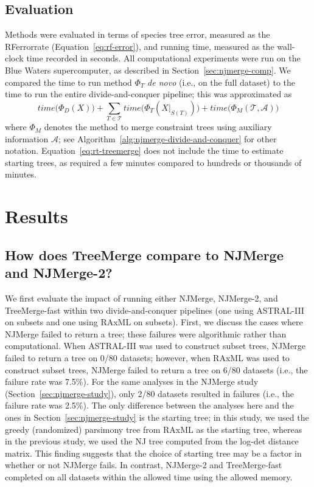 \subsection{Evaluation}
Methods were evaluated in terms of species tree error, measured as the \gls{RFerrorrate} (Equation~\ref{eq:rf-error}), and running time, measured as the wall-clock time recorded in seconds.
All computational experiments were run on the Blue Waters supercomputer, as described in Section~\ref{sec:njmerge-comp}.
We compared the time to run method $\Phi_T$ {\em de novo} (i.e., on the full dataset) to the time to run the entire divide-and-conquer pipeline; this was approximated as
\begin{equation}
	\label{eq:rt-treemerge}
	time\big(\Phi_D(X)\big) +  \sum_{T \in \mathcal{T}} time\big( \Phi_T(X|_{S(T)}) \big) + time\big( \Phi_M(\mathcal{T}, \mathcal{A}) \big)
\end{equation}
where $\Phi_M$ denotes the method to merge constraint trees using auxiliary information $\mathcal{A}$; see Algorithm~\ref{alg:njmerge-divide-and-conquer} for other notation.
Equation~\ref{eq:rt-treemerge} does not include the time to estimate starting trees, as required a few minutes compared to hundreds or thousands of minutes.

\section{Results}
\label{sec:treemerge-results}
\subsection{How does TreeMerge compare to NJMerge and NJMerge-2?}
We first evaluate the impact of running either NJMerge, NJMerge-2, and TreeMerge-fast within two divide-and-conquer pipelines (one using ASTRAL-III on subsets and one using RAxML on subsets).
First, we discuss the cases where NJMerge failed to return a tree; these failures were algorithmic rather than computational.
When ASTRAL-III was used to construct subset trees, NJMerge failed to return a tree on 0/80 datasets; however, when RAxML was used to construct subset trees, NJMerge failed to return a tree on 6/80 datasets (i.e., the failure rate was 7.5\%).
For the same analyses in the NJMerge study (Section~\ref{sec:njmerge-study}), only 2/80 datasets resulted in failures (i.e., the failure rate was 2.5\%).
The only difference between the analyses here and the ones in Section~\ref{sec:njmerge-study} is the starting tree; in this study, we used the greedy (randomized) parsimony tree from RAxML as the starting tree, whereas in the previous study, we used the NJ tree computed from the log-det distance matrix.
This finding suggests that the choice of starting tree may be a factor in whether or not NJMerge fails.
In contrast, NJMerge-2 and TreeMerge-fast completed on all datasets within the allowed time using the allowed memory.

